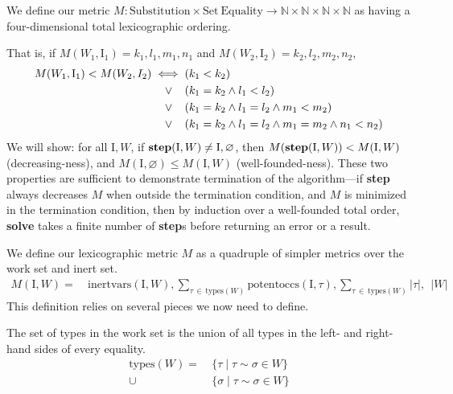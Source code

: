 \documentclass[10pt, letterpaper, oneside]{article}
\newcommand{\inertset}{\text{I}}
\begin{document}
We define our metric \(M : \text{Substitution} \times \text{Set}~\text{Equality} \to \mathbb{N} \times \mathbb{N} \times \mathbb{N} \times \mathbb{N}\) as having a four-dimensional total lexicographic ordering.

That is, if \(M(W_1, \inertset_1) = k_1, l_1, m_1, n_1\) and \(M(W_2, \inertset_2) = k_2, l_2, m_2, n_2\),
\begin{alignat*}{1}
  M(W_1, \inertset_1) < M(W_2, I_2) \iff (&k_1 < k_2)\\
                     \lor\hspace{1.1em}(&k_1 = k_2 \land l_1 < l_2)\\
                     \lor\hspace{1.1em}(&k_1 = k_2 \land l_1 = l_2 \land m_1 < m_2)\\
                     \lor\hspace{1.1em}(&k_1 = k_2 \land l_1 = l_2 \land m_1 = m_2 \land n_1 < n_2)
\end{alignat*}
We will show: for all \(\inertset, W\), if \(\text{\bf step}(\inertset, W) \ne \inertset, \varnothing\), then \(M(\text{\bf step}(\inertset, W)) < M(\inertset, W)\) (decreasing-ness), and \(M(\inertset, \varnothing) \le M(\inertset, W)\) (well-founded-ness). These two properties are sufficient to demonstrate termination of the algorithm---if \textbf{step} always decreases \(M\) when outside the termination condition, and \(M\) is minimized in the termination condition, then by induction over a well-founded total order, \textbf{solve} takes a finite number of \textbf{step}s before returning an error or a result.

We define our lexicographic metric \(M\) as a quadruple of simpler metrics over the work set and inert set.
\begin{align*}
  M(\inertset, W) = &~\text{inertvars}(\inertset, W), \!\!\!\!\!\sum_{\tau\,\in\,\text{types}(W)}\!\!\!\!\!\!\!\!\text{potentoccs}(\inertset, \tau), \!\!\!\!\!\sum_{\tau\,\in\,\text{types}(W)}\!\!\!\!\!\!\!\!|\tau|,\ \ |W|
\end{align*}
This definition relies on several pieces we now need to define.

The set of types in the work set is the union of all types in the left- and right-hand sides of every equality.
\begin{align*}
  \text{types}(W) =    &~\{\tau \mid \tau \sim \sigma \in W \}\\
                  \cup &~\{\sigma \mid \tau \sim \sigma \in W \}
\end{align*}
\end{document}

